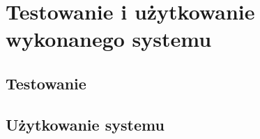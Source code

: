 \chapter{Testowanie i użytkowanie wykonanego systemu}
\label{chap:Testy}

\section[Testowanie][Testowanie]{Testowanie}

\section[Użytkowanie systemu][Użytkowanie systemu]{Użytkowanie systemu}


